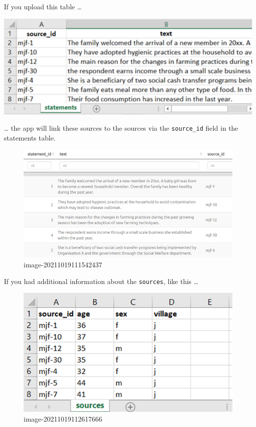 \documentclass[
]{book}
\begin{document}
If you upload this table \ldots{}

\includegraphics[width=6.77083in,height=\textheight]{_assets/image-20211019095700443.png}

\ldots{} the app will link these sources to the sources via the \texttt{source\_id} field in the statements table.

\begin{figure}
\centering
\includegraphics[width=6.77083in,height=\textheight]{_assets/image-20211019111542437.png}
\caption{image-20211019111542437}
\end{figure}

If you had additional information about the \texttt{sources}, like this \ldots{}

\begin{figure}
\centering
\includegraphics[width=6.77083in,height=\textheight]{_assets/image-20211019112617666.png}
\caption{image-20211019112617666}
\end{figure}
\end{document}
